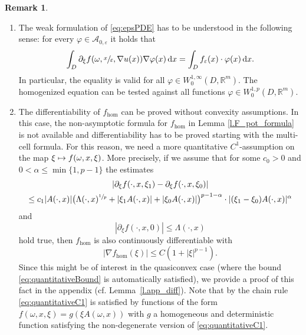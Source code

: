 \documentclass[11pt]{article}
\newcommand{\cf}{cf.\xspace}
\numberwithin{equation}{section}
\newenvironment{enumeratea}
{\bgroup\def\theenumi{\alph{enumi}}\begin{enumerate}}
{\end{enumerate}\egroup}
\def\mto{\mathchoice{\longmapsto}{\mapsto}{\mapsto}{\mapsto}}
\theoremstyle{definition}
\newtheorem{remark}[theorem]{Remark}
\let\e\varepsilon
\let\w\omega
\newcommand{\dx}{\,\mathrm{d}x}
\newcommand{\R}{\mathbb{R}}
\begin{document}
\begin{remark}\label{r.weaksol}
\begin{enumeratea}
\item
The weak formulation of \eqref{eq:epsPDE} has to be understood in the following sense: for every $\varphi\in\mathcal{A}_{0,\e}$ it holds that
\begin{equation*}
\int_D \partial_{\xi}f(\w,\sfrac{x}{\e},\nabla u(x)) \nabla\varphi(x)\dx=\int_D f_{\e}(x)\cdot\varphi(x)\dx.
\end{equation*}
In particular, the equality is valid for all $\varphi\in W^{1,\infty}_0(D,\R^m)$. The homogenized equation can be tested against all functions $\varphi\in W^{1,p}_0(D,\R^m)$.

\item
The differentiability of $f_{\hom}$ can be proved without convexity assumptions. In this case, the non-asymptotic formula for $f_{\hom}$ in Lemma \ref{l.F_pot_formula} is not available and differentiability has to be proved starting with the multi-cell formula. For this reason, we need a more quantitative $C^1$-assumption on the map $\xi\mto f(\w,x,\xi)$. More precisely, if we assume that for some $c_0>0$ and $0<\alpha\leq\min\{1,p-1\}$ the estimates
\begin{multline}\label{eq:quantitativeC1}
| \partial_{\xi}f(\cdot,x,\xi_1)-\partial_{\xi}f(\cdot,x,\xi_0)|\\
\leq c_1|A(\cdot,x)|\bigl(\Lambda(\cdot,x)^{\sfrac{1}{p}}+|\xi_1A(\cdot,x)|+|\xi_0A(\cdot,x)|\bigr)^{p-1-\alpha}
\cdot|(\xi_1-\xi_0)A(\cdot,x)|^{\alpha}
\end{multline}
and
\begin{equation}\label{eq:quantitativeBound}
|\partial_{\xi}f(\cdot,x,0)|\leq\Lambda(\cdot,x)
\end{equation}
hold true, then $f_{\hom}$ is also continuously differentiable with
\[
|\nabla f_{\hom}(\xi)|\leq C(1+|\xi|^{p-1}).
\]
Since this might be of interest in the quasiconvex case (where the bound \eqref{eq:quantitativeBound} is automatically satisfied), we provide a proof of this fact in the appendix (\cf Lemma~\ref{l.app_diff}). Note that by the chain rule \eqref{eq:quantitativeC1} is satisfied by functions of the form $f(\w,x,\xi)=g(\xi A(\w,x))$ with $g$ a homogeneous and deterministic function satisfying the non-degenerate version of \eqref{eq:quantitativeC1}.


\end{enumeratea}
\end{remark}
\end{document}
